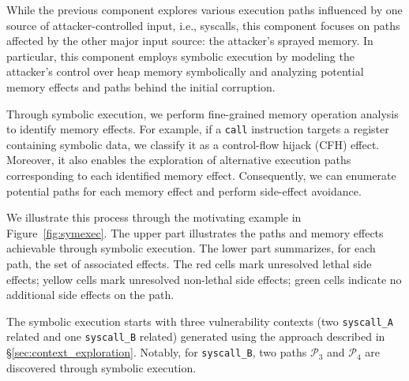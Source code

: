 While the previous component explores various execution paths influenced by one source of attacker-controlled input, i.e., syscalls, this component focuses on paths affected by the other major input source: the attacker's sprayed memory.
In particular, this component employs symbolic execution by modeling the attacker's control over heap memory symbolically and analyzing potential memory effects and paths behind the initial corruption. 

Through symbolic execution, we perform fine-grained memory operation analysis to identify memory effects.
For example, if a \texttt{call} instruction targets a register containing symbolic data, we classify it as a control-flow hijack (CFH) effect.
Moreover, it also enables the exploration of alternative execution paths corresponding to each identified memory effect. Consequently, we can enumerate potential paths for each memory effect and perform side-effect avoidance.



We illustrate this process through the motivating example in Figure~\ref{fig:symexec}. The upper part illustrates the paths and memory effects achievable through symbolic execution. The lower part summarizes, for each path, the set of associated effects. The red cells mark unresolved lethal side effects; yellow cells mark unresolved non-lethal side effects; green cells indicate no additional side effects on the path.


The symbolic execution starts with three vulnerability contexts (two \texttt{syscall\_A} related and one \texttt{syscall\_B} related) generated using the approach described in \S\ref{sec:context_exploration}. Notably, for \texttt{syscall\_B}, two paths $\mathcal{P}_3$ and $\mathcal{P}_4$ are discovered through symbolic execution.


